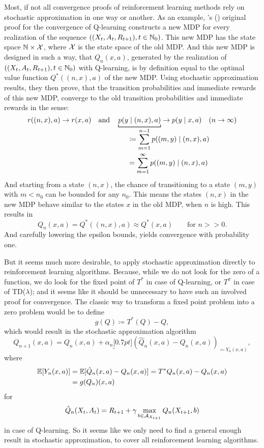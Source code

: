 Most, if not all convergence proofs of reinforcement learning methods rely on stochastic approximation in one way or another. As an example, \citeauthor{watkinsQlearning1992}'s (\citeyear{watkinsQlearning1992}) original proof for the convergence of Q-learning constructs a new MDP for every realization of the sequence \(((X_t, A_t,R_{t+1}), t\in\mathbb{N}_0)\). This new MDP has the state space \(\mathbb{N}\times\mathcal{X}\), where \(\mathcal{X}\) is the state space of the old MDP. And this new MDP is designed in such a way, that \(Q_n(x,a)\), generated by the realization of \(((X_t, A_t,R_{t+1}), t\in\mathbb{N}_0)\) with Q-learning, is by definition equal to the optimal value function \(Q^*((n,x),a)\) of the new MDP. Using stochastic approximation results, they then prove, that the transition probabilities and immediate rewards of this new MDP, converge to the old transition probabilities and immediate rewards in the sense:
\[
    r((n,x),a) \to r(x,a) \quad \text{and}\quad \underbracket[0.7pt]{p(y\mid (n,x), a)}_{
        \begin{aligned}
            &\coloneqq\sum_{m=1}^{n-1}\mathrlap{p((m,y)\mid (n,x),a)}\\
            &=\sum_{m=1}^{\infty}\mathrlap{p((m,y)\mid (n,x),a)}
        \end{aligned}
    }\to p(y\mid x,a) \quad (n\to \infty)
\]
And starting from a state \((n,x)\), the chance of transitioning to a state \((m,y)\) with \(m<n_0\) can be bounded for any \(n_0\). This means the states \((n,x)\) in the new MDP behave similar to the states \(x\) in the old MDP, when \(n\) is high. This results in 
\[
    Q_n(x,a)= Q^*((n,x),a)\approx Q^*(x,a) \qquad \text{for } n>>0.
\]
And carefully lowering the epsilon bounds, yields convergence with probability one.

But it seems much more desirable, to apply stochastic approximation directly to reinforcement learning algorithms. Because, while we do not look for the zero of a function, we do look for the fixed point of \(T^*\) in case of Q-learning, or \(T^\pi\) in case of TD(\(\lambda\)); and it seems like it should be unnecessary to have such an involved proof for convergence. The classic way to transform a fixed point problem into a zero problem would be to define
\[
    g(Q)\coloneqq T^*(Q)-Q,
\]
which would result in the stochastic approximation algorithm
\[
    Q_{n+1}(x,a) = Q_n(x,a) + \alpha_n \underbracket[0.7pt]{(\hat{Q}_n(x,a) -Q_n(x,a))}_{\eqqcolon Y_n(x,a)},
\]
where
\begin{align*}
    \mathbb{E}[Y_n(x,a)]
    &=\mathbb{E}[\hat{Q}_n(x,a) -Q_n(x,a)]
    =T^*Q_n(x,a)-Q_n(x,a)\\
    &=g(Q_n)(x,a)
\end{align*}
for
\[
    \hat{Q}_n(X_t,A_t)=R_{t+1} + \gamma \max_{b\in\mathcal{A}_{X_{t+1}}} Q_n(X_{t+1}, b)
\] 
in case of Q-learning. So it seems like we only need to find a general enough result in stochastic approximation, to cover all reinforcement learning algorithms. 

